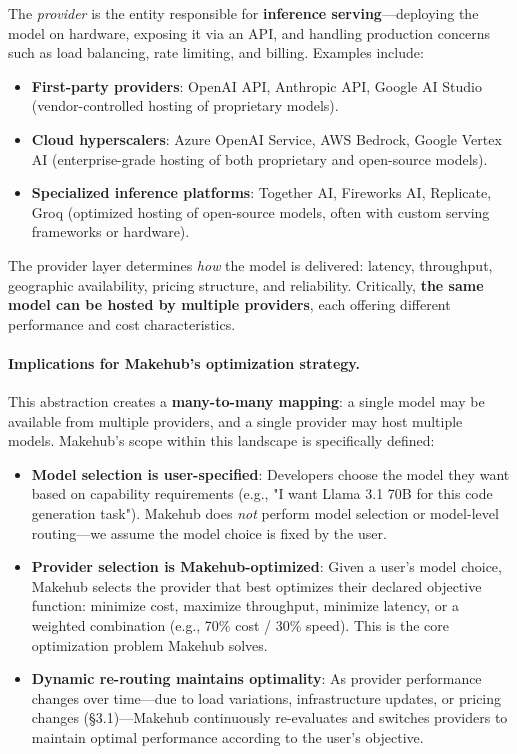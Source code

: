 \documentclass[english]{article}
\begin{document}
The \textit{provider} is the entity responsible for \textbf{inference serving}—deploying the model on hardware, exposing it via an API, and handling production concerns such as load balancing, rate limiting, and billing. Examples include:

\begin{itemize}
    \item \textbf{First-party providers}: OpenAI API, Anthropic API, Google AI Studio (vendor-controlled hosting of proprietary models).
    \item \textbf{Cloud hyperscalers}: Azure OpenAI Service, AWS Bedrock, Google Vertex AI (enterprise-grade hosting of both proprietary and open-source models).
    \item \textbf{Specialized inference platforms}: Together AI, Fireworks AI, Replicate, Groq (optimized hosting of open-source models, often with custom serving frameworks or hardware).
\end{itemize}

The provider layer determines \emph{how} the model is delivered: latency, throughput, geographic availability, pricing structure, and reliability. Critically, \textbf{the same model can be hosted by multiple providers}, each offering different performance and cost characteristics.

\paragraph{Implications for Makehub's optimization strategy.}

This abstraction creates a \textbf{many-to-many mapping}: a single model may be available from multiple providers, and a single provider may host multiple models. Makehub's scope within this landscape is specifically defined:

\begin{itemize}
    \item \textbf{Model selection is user-specified}: Developers choose the model they want based on capability requirements (e.g., "I want Llama 3.1 70B for this code generation task"). Makehub does \emph{not} perform model selection or model-level routing—we assume the model choice is fixed by the user.

    \item \textbf{Provider selection is Makehub-optimized}: Given a user's model choice, Makehub selects the provider that best optimizes their declared objective function: minimize cost, maximize throughput, minimize latency, or a weighted combination (e.g., 70\% cost / 30\% speed). This is the core optimization problem Makehub solves.

    \item \textbf{Dynamic re-routing maintains optimality}: As provider performance changes over time—due to load variations, infrastructure updates, or pricing changes (§3.1)—Makehub continuously re-evaluates and switches providers to maintain optimal performance according to the user's objective.
\end{itemize}
\end{document}
